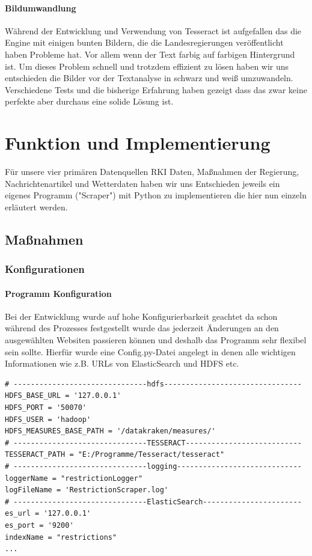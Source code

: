 \documentclass[12pt,oneside,a4paper,parskip]{scrbook}
\begin{document}
\subsubsection{Bildumwandlung}\label{sec:sub:sub:bild}
Während der Entwicklung und Verwendung von Tesseract ist aufgefallen das die Engine mit einigen bunten Bildern, die die Landesregierungen veröffentlicht haben Probleme hat. Vor allem wenn der Text farbig auf farbigen Hintergrund ist. Um dieses Problem schnell und trotzdem effizient zu lösen haben wir uns entschieden die Bilder vor der Textanalyse in schwarz und weiß umzuwandeln. Verschiedene Tests und die bisherige Erfahrung haben gezeigt dass das zwar keine perfekte aber durchaus eine solide Lösung ist.

\chapter{Funktion und Implementierung}

Für unsere vier primären Datenquellen RKI Daten, Maßnahmen der Regierung, Nachrichtenartikel und Wetterdaten haben wir uns Entschieden jeweils ein eigenes Programm ("Scraper") mit Python zu implementieren die hier nun einzeln erläutert werden.

\section{Maßnahmen}

\subsection{Konfigurationen}

\subsubsection{Programm Konfiguration}
Bei der Entwicklung wurde auf hohe Konfigurierbarkeit geachtet da schon während des Prozesses festgestellt wurde das jederzeit Änderungen an den ausgewählten Websiten passieren können und deshalb das Programm sehr flexibel sein sollte. Hierfür wurde eine Config.py-Datei angelegt in denen alle wichtigen Informationen wie z.B. URLs von ElasticSearch und HDFS etc.

\begin{lstlisting}[caption=Config für das Programm]
# -------------------------------hdfs--------------------------------
HDFS_BASE_URL = '127.0.0.1'
HDFS_PORT = '50070'
HDFS_USER = 'hadoop'
HDFS_MEASURES_BASE_PATH = '/datakraken/measures/'
# -------------------------------TESSERACT---------------------------
TESSERACT_PATH = "E:/Programme/Tesseract/tesseract"
# -------------------------------logging-----------------------------
loggerName = "restrictionLogger"
logFileName = 'RestrictionScraper.log'
# -------------------------------ElasticSearch-----------------------
es_url = '127.0.0.1'
es_port = '9200'
indexName = "restrictions"
...
\end{lstlisting}
\end{document}
